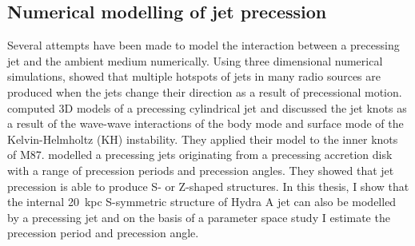  \subsection{Numerical modelling of jet precession}
Several attempts have been made to model the interaction between a precessing jet and the ambient medium numerically. Using three dimensional numerical simulations, \citet{cox91} showed that multiple hotspots of jets in many radio sources are produced when the jets change their direction as a result of precessional motion. \citet{hardee01} computed 3D models of a precessing cylindrical jet and discussed the jet knots as a result of the wave-wave interactions of the body mode and surface mode of the Kelvin-Helmholtz (KH) instability. They applied their model to the inner knots of M87. \citet{kurosawa08} modelled a precessing jets originating from a precessing accretion disk with a range of precession periods and precession angles. They showed that jet precession is able to produce S- or Z-shaped structures. In this thesis, I show that the internal 20~kpc S-symmetric structure of Hydra A jet can also be modelled by a precessing jet and on the basis of a parameter space study I estimate the precession period and precession angle.





